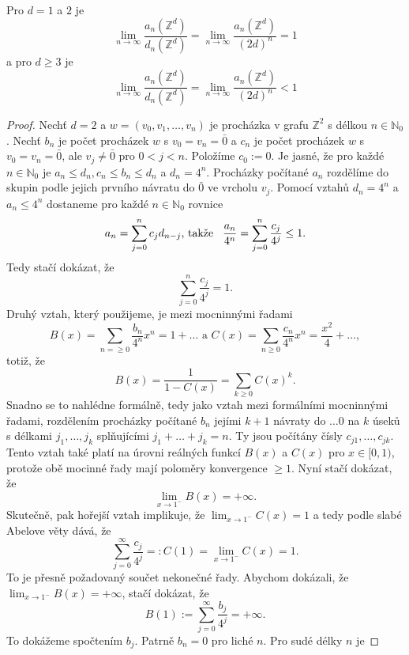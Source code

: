 \documentclass[../main.tex]{subfiles}
\begin{document}
\begin{theorem}[Pólya]
    Pro $d = 1$ a $2$ je \[ \lim_{n\to\infty}\frac{a_n(\mathbb{Z}^d)}{d_n(\mathbb{Z}^d)} = \lim_{n\to\infty}\frac{a_n(\mathbb{Z}^d)}{(2d)^n} = 1 \]
    a pro $d \geq 3$ je
    \[ \lim_{n\to\infty} \frac{a_n(\mathbb{Z}^d)}{d_n(\mathbb{Z}^d)} = \lim_{n\to\infty}\frac{a_n(\mathbb{Z}^d)}{(2d)^n} < 1 \]
\end{theorem}
\begin{proof}
    Nechť $d = 2$ a $w = (v_0, v_1, \dots, v_n)$ je procházka v grafu $\mathbb{Z}^2$ s délkou $n \in \mathbb{N}_0$.
    Nechť $b_n$ je počet procházek $w$ s $v_0 = v_n = \bar{0}$ a $c_n$ je počet procházek $w$ s $v_0 = v_n = \bar{0}$,
    ale $v_j \neq \bar{0}$ pro $ 0 < j < n$. Položíme $c_0 := 0$. Je jasné, že pro každé $n \in \mathbb{N}_0$ je
    $a_n \leq d_n, c_n \leq b_n \leq d_n$ a $d_n = 4^n$. Procházky počítané $a_n$ rozdělíme do skupin podle jejich prvního návratu do 
    $\bar{0}$ ve vrcholu $v_j$. Pomocí vztahů $d_n = 4^n$ a $a_n \leq 4^n$ dostaneme pro každé $n \in \mathbb{N}_0$ rovnice
    \[
        a_n = \sum_{j=0}^{n} c_jd_{n-j} \text{, takže} \hspace{3mm} \frac{a_n}{4^n} = \sum_{j=0}^{n} \frac{c_j}{4^j} \leq 1.
    \]
    Tedy stačí dokázat, že 
    \[ \sum_{j=0}^{n} \frac{c_j}{4^j} = 1.\]
    Druhý vztah, který použijeme, je mezi mocninnými řadami
    \[ B(x) = \sum_{n=\geq 0} \frac{b_n}{4^n}x^n = 1 + \dots \text{ a } C(x) = \sum_{n\geq 0} \frac{c_n}{4^n}x^n = \frac{x^2}{4} + \dots, \]
    totiž, že
    \[ B(x) = \frac{1}{1-C(x)} = \sum_{k \geq 0} C(x)^k. \]
    Snadno se to nahlédne formálně, tedy jako vztah mezi formálními mocninnými řadami, rozdělením procházky počítané $b_n$ jejími $k+1$ návraty do $\dots{0}$
    na $k$ úseků s délkami $j_1, \dots, j_k$ splňujícími $j_1 + \dots + j_k = n$. Ty jsou počítány čísly $c_{j1}, \dots, c_{jk}$.
    Tento vztah také platí na úrovni reálných funkcí $B(x)$ a $C(x)$ pro $x \in [0,1)$, protože obě mocinné řady mají poloměry konvergence $\geq 1$.
    Nyní stačí dokázat, že 
    \[
        \lim_{x\to 1^-} B(x) = +\infty.
    \]
    Skutečně, pak hořejší vztah implikuje, že $\lim_{x\to 1^-} C(x) = 1$ a tedy podle slabé Abelove věty dává, že
    \[
        \sum_{j=0}^\infty \frac{c_j}{4^j} =: C(1) = \lim_{x\to 1^-} C(x) = 1.
    \]
    To je přesně požadovaný součet nekonečné řady.
    Abychom dokázali, že $\lim_{x\to 1^-} B(x) = +\infty$, stačí dokázat, že
    \[
        B(1) := \sum_{j = 0}^\infty \frac{b_j}{4^j} = +\infty.
    \]
    To dokážeme spočtením $b_j$. Patrně $b_n = 0$ pro liché $n$. Pro sudé délky $n$ je

\end{proof}
\end{document}
